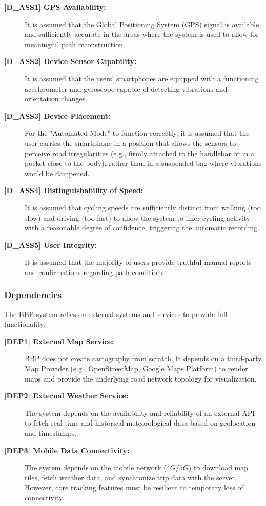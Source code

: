 \begin{description}
    \item[\textbf{[D\_ASS1] GPS Availability:}] It is assumed that the Global Positioning System (GPS) signal is available and sufficiently accurate in the areas where the system is used to allow for meaningful path reconstruction.
    \item[\textbf{[D\_ASS2] Device Sensor Capability:}] It is assumed that the users' smartphones are equipped with a functioning accelerometer and gyroscope capable of detecting vibrations and orientation changes.
    \item[\textbf{[D\_ASS3] Device Placement:}] For the "Automated Mode" to function correctly, it is assumed that the user carries the smartphone in a position that allows the sensors to perceive road irregularities (e.g., firmly attached to the handlebar or in a pocket close to the body), rather than in a suspended bag where vibrations would be dampened.
    \item[\textbf{[D\_ASS4] Distinguishability of Speed:}] It is assumed that cycling speeds are sufficiently distinct from walking (too slow) and driving (too fast) to allow the system to infer cycling activity with a reasonable degree of confidence, triggering the automatic recording.
    \item[\textbf{[D\_ASS5] User Integrity:}] It is assumed that the majority of users provide truthful manual reports and confirmations regarding path conditions.
\end{description}

\subsubsection{Dependencies}
The BBP system relies on external systems and services to provide full functionality.

\begin{description}
    \item[\textbf{[DEP1] External Map Service:}] BBP does not create cartography from scratch. It depends on a third-party Map Provider (e.g., OpenStreetMap, Google Maps Platform) to render maps and provide the underlying road network topology for visualization.
    \item[\textbf{[DEP2] External Weather Service:}] The system depends on the availability and reliability of an external API to fetch real-time and historical meteorological data based on geolocation and timestamps.
    \item[\textbf{[DEP3] Mobile Data Connectivity:}] The system depends on the mobile network ($4G/5G$) to download map tiles, fetch weather data, and synchronize trip data with the server. However, core tracking features must be resilient to temporary loss of connectivity.
\end{description}

